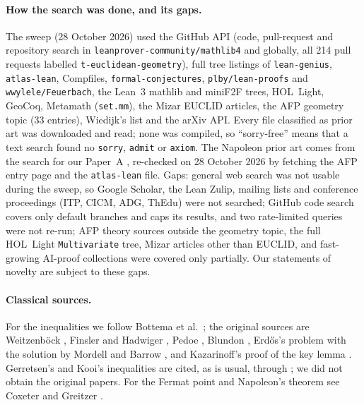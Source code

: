 \documentclass[11pt]{article}
\theoremstyle{definition}
\theoremstyle{remark}
\newcommand{\lean}[1]{\texttt{#1}}
\begin{document}
\paragraph{How the search was done, and its gaps.} The sweep (28 October 2026) used the GitHub API
(code, pull-request and repository search in \lean{leanprover-community/mathlib4} and globally, all
214 pull requests labelled \lean{t-euclidean-geometry}), full tree listings of \lean{lean-genius},
\lean{atlas-lean}, Compfiles, \lean{formal-conjectures}, \lean{plby/lean-proofs} and
\lean{wwylele/Feuerbach}, the Lean~3 mathlib and miniF2F trees, HOL~Light, GeoCoq, Metamath
(\lean{set.mm}), the Mizar EUCLID articles, the AFP geometry topic (33 entries), Wiedijk's list and the
arXiv API. Every file classified as prior art was downloaded and read; none was compiled, so
``sorry-free'' means that a text search found no \lean{sorry}, \lean{admit} or \lean{axiom}. The
Napoleon prior art comes from the search for our Paper~A \cite{paperA}, re-checked on 28 October 2026
by fetching the AFP entry page and the \lean{atlas-lean} file. Gaps: general web search was not
usable during the sweep, so Google Scholar, the Lean Zulip, mailing lists and conference proceedings
(ITP, CICM, ADG, ThEdu) were not searched; GitHub code search covers only default branches and caps
its results, and two rate-limited queries were not re-run; AFP theory sources outside the geometry
topic, the full HOL~Light \lean{Multivariate} tree, Mizar articles other than EUCLID, and
fast-growing AI-proof collections were covered only partially. Our statements of novelty are
subject to these gaps.

\paragraph{Classical sources.} For the inequalities we follow Bottema et al.\ \cite{bottema}; the
original sources are Weitzenb\"ock \cite{weitzenboeck}, Finsler and Hadwiger \cite{finslerhadwiger},
Pedoe \cite{pedoe1941,pedoe1942}, Blundon \cite{blundon1965}, Erdős's problem \cite{erdos1935} with
the solution by Mordell and Barrow \cite{mordellbarrow1937}, and Kazarinoff's proof of the key lemma
\cite{kazarinoff1957}. Gerretsen's and Kooi's inequalities are cited, as is usual, through
\cite{bottema}; we did not obtain the original papers. For the Fermat point and Napoleon's theorem
see Coxeter and Greitzer \cite{coxetergreitzer}.
\end{document}
